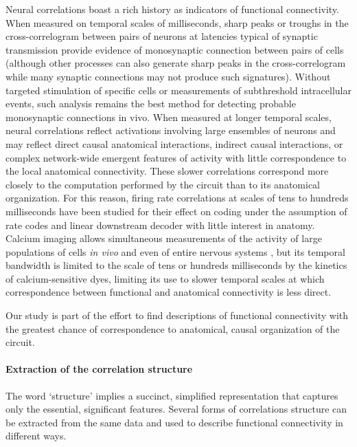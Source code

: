 \documentclass[10pt]{article}
\begin{document}
Neural correlations boast a rich history as indicators of functional connectivity. When measured on temporal scales of milliseconds, sharp peaks or troughs in the cross-correlogram between pairs of neurons at latencies typical of synaptic transmission provide evidence of monosynaptic connection between pairs of cells \cite{Moore:1970,Alonso:1998,Denman:2013} (although other processes can also generate sharp peaks in the cross-correlogram while many synaptic connections may not produce such signatures). Without targeted stimulation of specific cells or measurements of subthreshold intracellular events, such analysis remains the best method for detecting probable monosynaptic connections in vivo. When measured at longer temporal scales, neural correlations reflect activations involving large ensembles of neurons and may reflect direct causal anatomical interactions, indirect causal interactions, or complex network-wide emergent features of activity with little correspondence to the local anatomical connectivity. These slower correlations correspond more closely to the computation performed by the circuit than to its anatomical organization. For this reason, firing rate correlations at scales of tens to hundreds milliseconds have been studied for their effect on coding under the assumption of rate codes and linear downstream decoder \cite{Averbeck:2006} with little interest in anatomy.  Calcium imaging allows simultaneous measurements of the activity of large populations of cells \emph{in vivo} \cite{Katona:2012,Cotton:2013} and even of entire nervous systems \cite{Leung:2013,Ahrens:2013}, but its temporal bandwidth is limited to the scale of tens or hundreds milliseconds by the kinetics of calcium-sensitive dyes, limiting its use to slower temporal scales at which correspondence between functional and anatomical connectivity is less direct.

Our study is part of the effort to find descriptions of functional connectivity with the greatest chance of correspondence to anatomical, causal organization of the circuit.

\paragraph{Extraction of the correlation structure}
The word `structure' implies a succinct, simplified representation that captures only the essential, significant features. Several forms of correlations structure can be extracted from the same data and used to describe functional connectivity in different ways.
\end{document}

